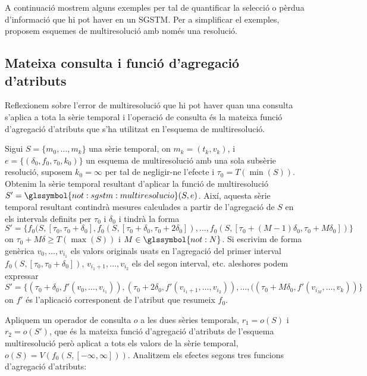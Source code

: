 








A continuació mostrem alguns exemples per tal de quantificar la
selecció o pèrdua d'informació que hi pot haver en un \gls{SGSTM}.
Per a simplificar el exemples, proposem esquemes de multiresolució amb
només una resolució.




\subsection{Mateixa consulta i funció d'agregació d'atributs}
\label{ex:multiresolucio:f=op}

Reflexionem sobre l'error de multiresolució que hi pot haver quan una
consulta s'aplica a tota la sèrie temporal i l'operació de consulta és
la mateixa funció d'agregació d'atributs que s'ha utilitzat en
l'esquema de multiresolució.


  Sigui $S=\{m_0,\dotsc,m_k\}$ una sèrie temporal, on $m_k=(t_k,v_k)$,
  i $e= \{ (\delta_0, f_0, \tau_0, k_0) \}$ un esquema de
  multiresolució amb una sola subsèrie resolució, suposem $k_0=\infty$
  per tal de negligir-ne l'efecte i $\tau_0=T(\min(S))$. Obtenim la
  sèrie temporal resultant d'aplicar la funció de multiresolució
  $S'=\glssymbol{not:sgstm:multiresolucio}(S,e)$.  Així, aquesta sèrie
  temporal resultant contindrà mesures calculades a partir de
  l'agregació de $S$ en els intervals definits per $\tau_0$ i
  $\delta_0$ i tindrà la forma $S'=\{ f_0(S,[\tau_0,\tau_0+\delta_0],
  f_0(S,[\tau_0+\delta_0,\tau_0+2\delta_0]),\dotsc,
  f_0(S,[\tau_0+(M-1)\delta_0,\tau_0+M\delta_0])\}$ on
  $\tau_0+M\delta\geq T(\max(S))$ i $M\in\glssymbol{not:N}$. Si
  escrivim de forma genèrica $v_0,\dotsc,v_{i_1}$ els valors originals
  usats en l'agregació del primer interval
  $f_0(S,[\tau_0,\tau_0+\delta_0])$, $v_{i_1+1},\dotsc,v_{i_2}$ els del
  segon interval, etc. aleshores podem expressar $S'=\{
  (\tau_0+\delta_0, f'(v_0,\dotsc,v_{i_1})), (\tau_0+2\delta_0,
  f'(v_{i_1+1},\dotsc,v_{i_2})), \dotsc, ((\tau_0+M\delta_0 ,f'(v_{i_M},
  \dotsc, v_k)) \}$ on $f'$ és l'aplicació corresponent de l'atribut
  que resumeix $f_0$.

  Apliquem un operador de consulta $o$ a les dues sèries temporals,
  $r_1=o(S)$ i $r_2=o(S')$, que és la mateixa funció d'agregació
  d'atributs de l'esquema multiresolució però aplicat a tots els
  valors de la sèrie temporal,
  $o(S)=V(f_0(S,[-\infty,\infty]))$. Analitzem els efectes segons tres
  funcions d'agregació d'atributs:

